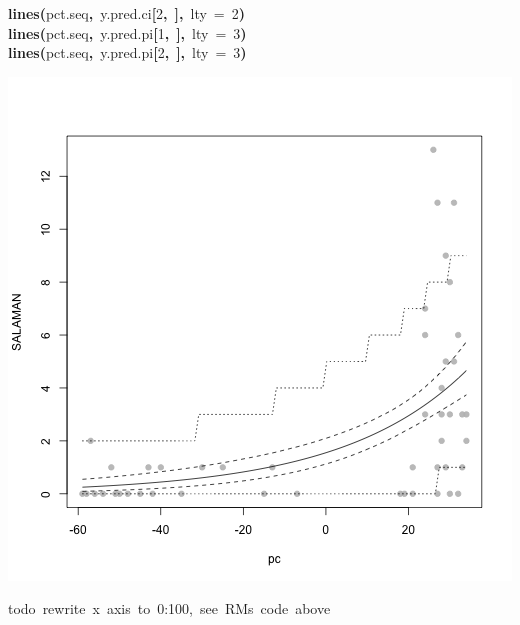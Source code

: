 \documentclass{article}
\makeatletter
\newcommand{\hlnumber}[1]{\textcolor[rgb]{0,0,0}{#1}}%
\newcommand{\hlfunctioncall}[1]{\textcolor[rgb]{.5,0,.33}{\textbf{#1}}}%
\newcommand{\hlkeyword}[1]{\textbf{#1}}%
\newcommand{\hlargument}[1]{\textcolor[rgb]{.69,.25,.02}{#1}}%
\newcommand{\hlcomment}[1]{\textcolor[rgb]{.18,.6,.34}{#1}}%
\newcommand{\hlsymbol}[1]{#1}%
\newcommand{\hlstd}[1]{\textcolor[rgb]{0,0,0}{#1}}%
\newenvironment{kframe}{%
 \def\FrameCommand##1{\hskip\@totalleftmargin \hskip-\fboxsep
 \colorbox{shadecolor}{##1}\hskip-\fboxsep
     \hskip-\linewidth \hskip-\@totalleftmargin \hskip\columnwidth}%
 \MakeFramed {\advance\hsize-\width
   \@totalleftmargin\z@ \linewidth\hsize
   \@setminipage}}%
 {\par\unskip\endMakeFramed}
\newenvironment{knitrout}{}{} %
\makeatother
\begin{document}
\begin{knitrout}
{\begin{kframe}
\begin{flushleft}
\hlstd{}\hlfunctioncall{lines}\hlkeyword{(}\hlsymbol{pct.seq}\hlkeyword{,}{\ }\hlsymbol{y.pred.ci}\hlkeyword{[}\hlnumber{2}\hlkeyword{,}{\ }\hlkeyword{]}\hlkeyword{,}{\ }\hlargument{lty}{\ }\hlargument{=}{\ }\hlnumber{2}\hlkeyword{)}\hspace*{\fill}\\
\hlstd{}\hlfunctioncall{lines}\hlkeyword{(}\hlsymbol{pct.seq}\hlkeyword{,}{\ }\hlsymbol{y.pred.pi}\hlkeyword{[}\hlnumber{1}\hlkeyword{,}{\ }\hlkeyword{]}\hlkeyword{,}{\ }\hlargument{lty}{\ }\hlargument{=}{\ }\hlnumber{3}\hlkeyword{)}\hspace*{\fill}\\
\hlstd{}\hlfunctioncall{lines}\hlkeyword{(}\hlsymbol{pct.seq}\hlkeyword{,}{\ }\hlsymbol{y.pred.pi}\hlkeyword{[}\hlnumber{2}\hlkeyword{,}{\ }\hlkeyword{]}\hlkeyword{,}{\ }\hlargument{lty}{\ }\hlargument{=}{\ }\hlnumber{3}\hlkeyword{)}\mbox{}
\normalfont
\end{flushleft}
\includegraphics{sal-fig} \begin{flushleft}
\ttfamily\noindent
\hlcomment{\usebox{\hlnormalsizeboxhash}todo{\ }rewrite{\ }x{\ }axis{\ }to{\ }0:100,{\ }see{\ }RM\usebox{\hlnormalsizeboxsinglequote}s{\ }code{\ }above}\mbox{}
\normalfont
\end{flushleft}
\end{kframe}}
\end{knitrout}
\end{document}
